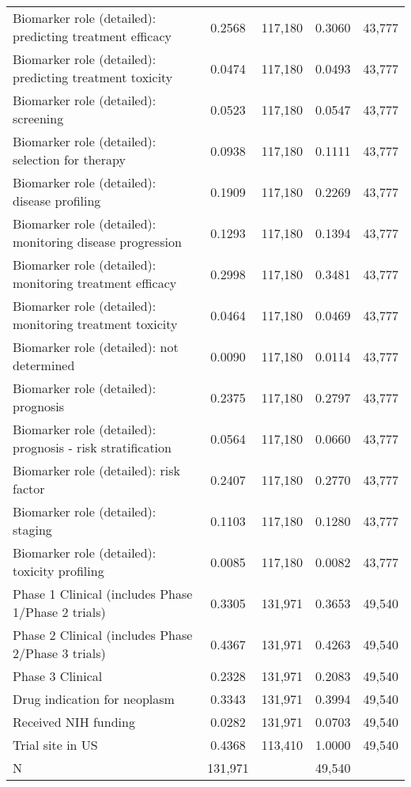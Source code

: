 \begin{table}[htbp]
\begin{tabular}{l*{2}{cc}}
Biomarker role (detailed): predicting treatment efficacy&      0.2568&     117,180&      0.3060&      43,777\\
Biomarker role (detailed): predicting treatment toxicity&      0.0474&     117,180&      0.0493&      43,777\\
Biomarker role (detailed): screening&      0.0523&     117,180&      0.0547&      43,777\\
Biomarker role (detailed): selection for therapy&      0.0938&     117,180&      0.1111&      43,777\\
Biomarker role (detailed): disease profiling&      0.1909&     117,180&      0.2269&      43,777\\
Biomarker role (detailed): monitoring disease progression&      0.1293&     117,180&      0.1394&      43,777\\
Biomarker role (detailed): monitoring treatment efficacy&      0.2998&     117,180&      0.3481&      43,777\\
Biomarker role (detailed): monitoring treatment toxicity&      0.0464&     117,180&      0.0469&      43,777\\
Biomarker role (detailed): not determined&      0.0090&     117,180&      0.0114&      43,777\\
Biomarker role (detailed): prognosis&      0.2375&     117,180&      0.2797&      43,777\\
Biomarker role (detailed): prognosis - risk stratification&      0.0564&     117,180&      0.0660&      43,777\\
Biomarker role (detailed): risk factor&      0.2407&     117,180&      0.2770&      43,777\\
Biomarker role (detailed): staging&      0.1103&     117,180&      0.1280&      43,777\\
Biomarker role (detailed): toxicity profiling&      0.0085&     117,180&      0.0082&      43,777\\
Phase 1 Clinical (includes Phase 1/Phase 2 trials)&      0.3305&     131,971&      0.3653&      49,540\\
Phase 2 Clinical (includes Phase 2/Phase 3 trials)&      0.4367&     131,971&      0.4263&      49,540\\
Phase 3 Clinical    &      0.2328&     131,971&      0.2083&      49,540\\
Drug indication for neoplasm&      0.3343&     131,971&      0.3994&      49,540\\
Received NIH funding&      0.0282&     131,971&      0.0703&      49,540\\
Trial site in US    &      0.4368&     113,410&      1.0000&      49,540\\
\hline
N                   &     131,971&            &      49,540&            \\
\hline\hline
\end{tabular}
\end{table}
